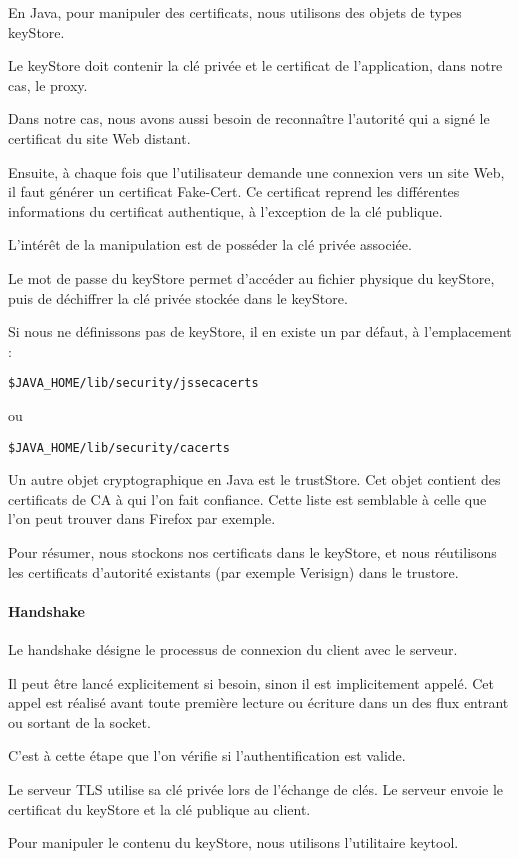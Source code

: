 En Java, pour manipuler des certificats, nous utilisons des objets de types keyStore.

Le keyStore doit contenir la clé privée et le certificat de l'application, dans notre cas, le proxy.

Dans notre cas, nous avons aussi besoin de reconnaître l'autorité qui a signé le certificat du site Web distant.

Ensuite, à chaque fois que l'utilisateur demande une connexion vers un site Web, il faut générer un certificat Fake-Cert. Ce certificat reprend les différentes informations du certificat authentique, à l'exception de la clé publique.

L'intérêt de la manipulation est de posséder la clé privée associée.

Le mot de passe du keyStore permet d'accéder au fichier physique du keyStore, puis de déchiffrer la clé privée stockée dans le keyStore.

Si nous ne définissons pas de keyStore, il en existe un par défaut, à l'emplacement :
\begin{verbatim}
$JAVA_HOME/lib/security/jssecacerts
\end{verbatim}
ou
\begin{verbatim}
$JAVA_HOME/lib/security/cacerts
\end{verbatim}


Un autre objet cryptographique en Java est le trustStore. Cet objet contient des certificats de CA à qui l'on fait confiance. Cette liste est semblable à celle que l'on peut trouver dans Firefox par exemple.

Pour résumer, nous stockons nos certificats dans le keyStore, et nous réutilisons les certificats d'autorité existants (par exemple Verisign) dans le trustore.


\paragraph{Handshake}

Le handshake désigne le processus de connexion du client avec le serveur.

Il peut être lancé explicitement si besoin, sinon il est implicitement appelé. Cet appel est réalisé avant toute première lecture ou écriture dans un des  flux entrant ou sortant de la socket.


C'est à cette étape que l'on vérifie si l'authentification est valide.


Le serveur TLS utilise sa clé privée lors de l'échange de clés.
Le serveur envoie le certificat du keyStore et la clé publique au client.

Pour manipuler le contenu du keyStore, nous utilisons l'utilitaire keytool.